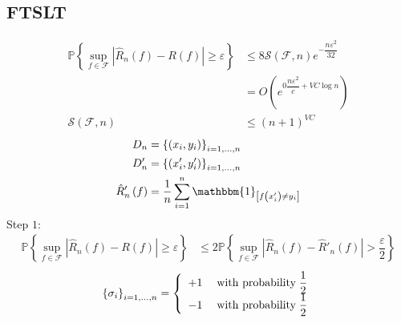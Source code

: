 \documentclass{article}
\begin{document}
\subsection{FTSLT}
\begin{align*}
\mathbb{P}\left\{\displaystyle\sup_{f \in \mathcal{F}} | \hat{R}_{n}\left(f\right) - R\left(f\right) | \geq  \varepsilon\right\} &\leq  8 \mathcal{S}\left(\mathcal{F}, n\right) e^{- \dfrac{n \varepsilon^{2}}{32}}
\\ &= O\left(e^{0 \dfrac{n \varepsilon^{2}}{c} + VC  \log n}\right)
\\ \mathcal{S}\left(\mathcal{F}, n\right) &\leq  \left(n + 1\right)^{VC }
\end{align*}
\begin{align*}
D_{n} &= \left\{\left(x_{i}, y_{i}\right)\right\}_{i = 1, ..., n}
\\ D'_{n} &= \left\{\left(x'_{i}, y'_{i}\right)\right\}_{i = 1, ..., n}
\\ \hat{R} '_{n}\left(f\right) &= \dfrac{1}{n} \displaystyle\sum_{i=1}^{n} \mathbbm{1}_{\left[f\left(x'_{i}\right) \neq  y_{i}\right]}
\end{align*}
Step $1$:
\begin{align*}
\mathbb{P}\left\{\displaystyle\sup_{f \in \mathcal{F}} | \hat{R}_{n}\left(f\right) - R\left(f\right) | \geq  \varepsilon\right\} &\leq  2 \mathbb{P}\left\{\displaystyle\sup_{f \in \mathcal{F}} | \hat{R}_{n}\left(f\right) - \hat{R} '_{n}\left(f\right) | > \dfrac{\varepsilon}{2}\right\}
\end{align*}
\[ \left\{\sigma_{i}\right\}_{i = 1, ..., n} =\left\{ \begin{array}{ll}
+1& \text{\;with probability\;} \dfrac{1}{2} \\
-1& \text{\;with probability\;} \dfrac{1}{2} \\
\end{array}\right. \]
\end{document}
